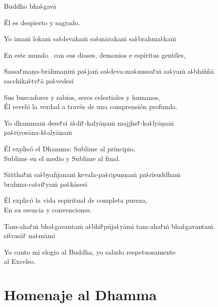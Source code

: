 Buddho bha꜕gavā

\begin{english}
  Él es despierto y sagrado.
\end{english}

Yo imaṁ lokaṁ sa꜕devakaṁ sa꜕mārakaṁ sa꜕brahma꜕kaṁ

\begin{english}
  En este mundo \pause\ con sus dioses, demonios e espíritus gentiles,
\end{english}

Sassa꜓maṇa-brāhmaṇiṁ pa꜕jaṁ sa꜕deva-ma꜕nussa꜓ṁ sa꜕yaṁ a꜕bhiññā sacchika꜕tv꜓ā pa꜕vedesi

\begin{english}
  Sus buscadores y sabios, seres celestiales y humanos,\\ Él reveló la verdad a través de una comprensión profunda.
\end{english}

Yo dhammaṁ dese꜓si ā꜕di꜓-kalyāṇaṁ majjhe꜓-ka꜕lyāṇaṁ \\pa꜕riyosāna-k꜕alyāṇaṁ

\begin{english}
  Él explicó el Dhamma: Sublime al principio,\\ Sublime en el medio y Sublime al final.
\end{english}

Sāttha꜓ṁ sa꜕byañjanaṁ kevala-pa꜕ripuṇṇaṁ pa꜕risuddhaṁ \\brahma-ca꜕ri꜓yaṁ pa꜕kāsesi

\begin{english}
  Él explicó la vida espiritual de completa pureza,\\En su esencia y convenciones.
\end{english}

Tam-aha꜓ṁ bha꜕gavantaṁ a꜕bhi꜓pūja꜕yāmi tam-aha꜓ṁ bha꜕gavantaṁ \\si꜕rasā꜓ na꜕māmi

\begin{english}
  Yo canto mi elogio al Buddha, yo saludo respetuosamente \\al Excelso.
\end{english}

\clearpage

\chapter{Homenaje al Dhamma}

\begin{leader}
\end{leader}


